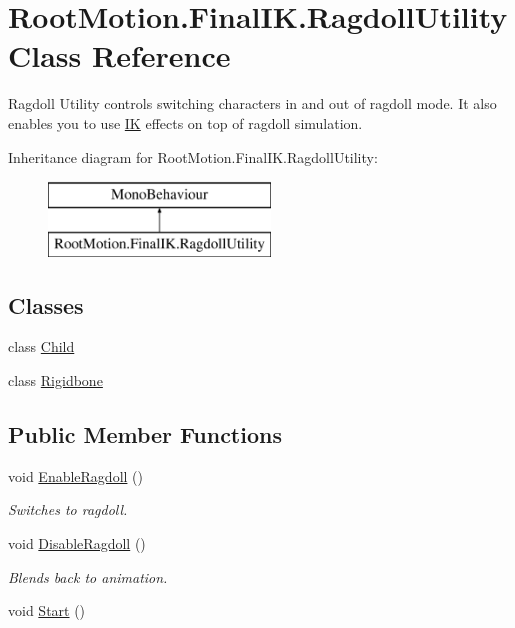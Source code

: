 \hypertarget{class_root_motion_1_1_final_i_k_1_1_ragdoll_utility}{}\section{Root\+Motion.\+Final\+I\+K.\+Ragdoll\+Utility Class Reference}
\label{class_root_motion_1_1_final_i_k_1_1_ragdoll_utility}


Ragdoll Utility controls switching characters in and out of ragdoll mode. It also enables you to use \mbox{\hyperlink{class_root_motion_1_1_final_i_k_1_1_i_k}{IK}} effects on top of ragdoll simulation.  


Inheritance diagram for Root\+Motion.\+Final\+I\+K.\+Ragdoll\+Utility\+:\begin{figure}[H]
\begin{center}
\leavevmode
\includegraphics[height=2.000000cm]{class_root_motion_1_1_final_i_k_1_1_ragdoll_utility}
\end{center}
\end{figure}
\subsection*{Classes}
\begin{DoxyCompactItemize}
\item 
class \mbox{\hyperlink{class_root_motion_1_1_final_i_k_1_1_ragdoll_utility_1_1_child}{Child}}
\item 
class \mbox{\hyperlink{class_root_motion_1_1_final_i_k_1_1_ragdoll_utility_1_1_rigidbone}{Rigidbone}}
\end{DoxyCompactItemize}
\subsection*{Public Member Functions}
\begin{DoxyCompactItemize}
\item 
void \mbox{\hyperlink{class_root_motion_1_1_final_i_k_1_1_ragdoll_utility_a178bb74ed5c6075d3bcbfe10cbd62b30}{Enable\+Ragdoll}} ()
\begin{DoxyCompactList}\small\item\em Switches to ragdoll. \end{DoxyCompactList}\item 
void \mbox{\hyperlink{class_root_motion_1_1_final_i_k_1_1_ragdoll_utility_a47ed207d4dcd8fcd87da1c2b4688a439}{Disable\+Ragdoll}} ()
\begin{DoxyCompactList}\small\item\em Blends back to animation. \end{DoxyCompactList}\item 
void \mbox{\hyperlink{class_root_motion_1_1_final_i_k_1_1_ragdoll_utility_a52a5a3b9c734f588fcb4cc34c9325371}{Start}} ()
\end{DoxyCompactItemize}
